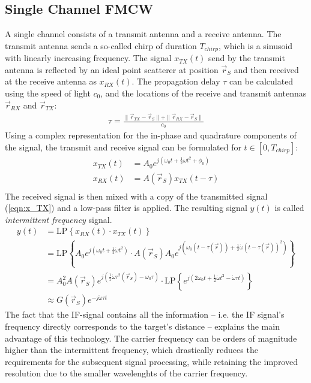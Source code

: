 \subsection{Single Channel FMCW}
A single channel consists of a transmit antenna and a receive antenna.
The transmit antenna sends a so-called chirp of duration $T_{chirp}$,
which is a sinusoid with linearly increasing frequency.
The signal $x_{TX}(t)$ send by the transmit antenna is reflected by an ideal point scatterer at position $\vec r_S$
and then received at the receive antenna as $x_{RX}(t)$.
The propagation delay $\tau$ can be calculated using the speed of light $c_0$,
and the locations of the receive and transmit antennas $\vec r_{RX}$ and $\vec r_{TX}$:
\begin{align}
    \tau = \frac{\| \vec r_{TX} - \vec r_S \|+\| \vec r_{RX} - \vec r_S \|}{c_0}
\end{align}
Using a complex representation for the in-phase and quadrature components of the signal,
the transmit and receive signal can be formulated for $t \in [0, T_{chirp}]$:
\begin{align}
    x_{TX}(t) & = A_0 e^{j(\omega_0t + \frac{1}{2}\dot \omega t^2 + \phi_0)} \label{eqn:x_TX} \\
    x_{RX}(t) & = A(\vec r_S) x_{TX}(t-\tau)                                 \label{eqn:x_RX} \\
\end{align}
The received signal is then mixed with a copy of the transmitted signal (\ref{eqn:x_TX}) and a low-pass filter is applied.
The resulting signal $y(t)$ is called \textit{intermittent frequency} signal.
\begin{align}
    y(t) & = \text{LP} \left\{ x_{RX}(t) \cdot x_{TX}(t) \right\}         \\
         & = \text{LP} \left\{
    A_0 e^{j(\omega_0t + \frac{1}{2}\dot \omega t^2) }
    \cdot A(\vec r_S) A_0 e^{j(\omega_0(t-\tau(\vec r)) + \frac{1}{2}\dot \omega (t-\tau(\vec r))^2) }
    \right\}                                                              \\
         & = A_0^2A(\vec r_S)
    e^{j(\frac{1}{2}\dot\omega\tau^2(\vec r_S)- \omega_0\tau)}
    \cdot  \text{LP} \left\{
    e^{j(2\omega_0 t + \frac{1}{2}\dot\omega t^2 - \dot\omega\tau t)}
    \right\}                                                \label{eqn:G} \\
         & \approx G(\vec r_S) e^{-j\dot\omega\tau t} \label{eqn:y_IF}
\end{align}
The fact that the IF-signal contains all the information
-- i.e. the IF signal's frequency directly corresponds to the target's distance --
explains the main advantage of this technology.
The carrier frequency can be orders of magnitude higher than the intermittent frequency,
which drastically reduces the requirements for the subsequent signal processing,
while retaining the improved resolution due to the smaller wavelenghts of the carrier frequency.

